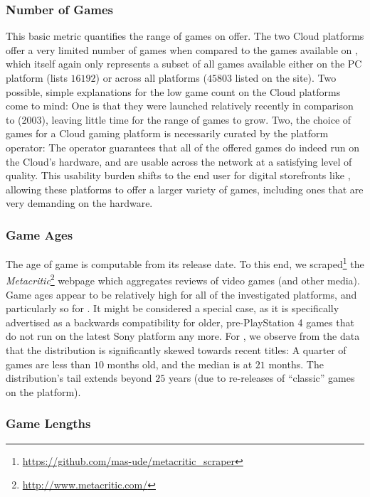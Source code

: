 \subsubsection{Number of Games}

This basic metric quantifies the range of games on offer. The two Cloud platforms offer a very limited number of games when compared to the games available on \steam, which itself again only represents a subset of all games available either on the PC platform (\metacritic lists $16192$) or across all platforms ($45803$ listed on the site). Two possible, simple explanations for the low game count on the Cloud platforms come to mind: One is that they were launched relatively recently in comparison to \steam (2003), leaving little time for the range of games to grow. Two, the choice of games for a Cloud gaming platform is necessarily curated by the platform operator: The operator guarantees that all of the offered games do indeed run on the Cloud's hardware, and are usable across the network at a satisfying level of quality. This usability burden shifts to the end user for digital storefronts like \steam, allowing these platforms to offer a larger variety of games, including ones that are very demanding on the hardware.


\subsubsection{Game Ages}

The age of game is computable from its release date. To this end, we scraped\footnote{\url{https://github.com/mas-ude/metacritic_scraper}} the \textit{Metacritic}\footnote{\url{http://www.metacritic.com/}} webpage which aggregates reviews of video games (and other media). Game ages appear to be  relatively high for all of the investigated platforms, and particularly so for \psnow. It might be considered a special case, as it is specifically advertised as a backwards compatibility for older, pre-PlayStation 4 games that do not run on the latest Sony platform any more. For \steam, we observe from the data that the distribution is significantly skewed towards recent titles: A quarter of games are less than $10$ months old, and the median is at $21$ months. The distribution's tail extends beyond $25$ years (due to re-releases of ``classic'' games on the platform).


\subsubsection{Game Lengths}

